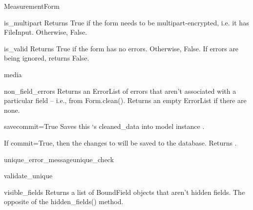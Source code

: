 \documentclass[letterpaper,10pt,english]{sphinxmanual}
\begin{document}
\begin{classdesc}{MeasurementForm}
\hypertarget{data.forms.MeasurementForm.is_multipart}{}\begin{methoddesc}[MeasurementForm]{is\_multipart}{}
Returns True if the form needs to be multipart-encrypted, i.e. it has
FileInput. Otherwise, False.
\end{methoddesc}

\hypertarget{data.forms.MeasurementForm.is_valid}{}\begin{methoddesc}[MeasurementForm]{is\_valid}{}
Returns True if the form has no errors. Otherwise, False. If errors are
being ignored, returns False.
\end{methoddesc}

\hypertarget{data.forms.MeasurementForm.media}{}\begin{memberdesc}[MeasurementForm]{media}\end{memberdesc}

\hypertarget{data.forms.MeasurementForm.non_field_errors}{}\begin{methoddesc}[MeasurementForm]{non\_field\_errors}{}
Returns an ErrorList of errors that aren't associated with a particular
field -- i.e., from Form.clean(). Returns an empty ErrorList if there
are none.
\end{methoddesc}

\hypertarget{data.forms.MeasurementForm.save}{}\begin{methoddesc}[MeasurementForm]{save}{commit=True}
Saves this `s cleaned\_data into model instance
.

If commit=True, then the changes to  will be saved to the
database. Returns .
\end{methoddesc}

\hypertarget{data.forms.MeasurementForm.unique_error_message}{}\begin{methoddesc}[MeasurementForm]{unique\_error\_message}{unique\_check}\end{methoddesc}

\hypertarget{data.forms.MeasurementForm.validate_unique}{}\begin{methoddesc}[MeasurementForm]{validate\_unique}{}\end{methoddesc}

\hypertarget{data.forms.MeasurementForm.visible_fields}{}\begin{methoddesc}[MeasurementForm]{visible\_fields}{}
Returns a list of BoundField objects that aren't hidden fields.
The opposite of the hidden\_fields() method.
\end{methoddesc}
\end{classdesc}
\end{document}
